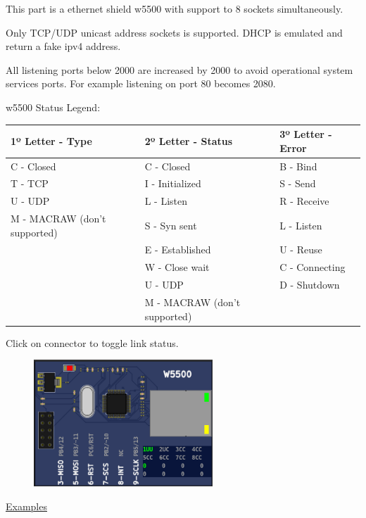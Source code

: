 This part is a ethernet shield w5500 with support to 8 sockets simultaneously.

Only TCP/UDP unicast address sockets is supported. 
DHCP is emulated and return a fake ipv4 address.

All listening ports below 2000 are increased by 2000 to avoid operational system services ports. 
For example listening on port 80 becomes 2080. 

w5500 Status Legend:
\begin{center}
\begin{tabular}{l|l|l}
\hline \textbf{1º Letter - Type} & \textbf{2º Letter - Status} & \textbf{3º Letter - Error}\\
\hline
\hline C - Closed & C - Closed & B - Bind\\
\hline T - TCP & I - Initialized & S - Send\\
\hline U - UDP & L - Listen & R - Receive\\
\hline M - MACRAW (don't supported) & S - Syn sent & L - Listen\\
\hline   & E - Established & U - Reuse\\
\hline   & W - Close wait & C - Connecting\\
\hline   & U - UDP & D - Shutdown\\
\hline   & M - MACRAW (don't supported) &   \\
\hline
\end{tabular}
\end{center}

Click on connector to toggle link status.

\begin{figure}[H]
\center
\includegraphics[width=0.6\textwidth]{img/part_w5500.png} 
\end{figure} 

\href{https://lcgamboa.github.io/picsimlab_examples/parts_ETH_w5500.html}{Examples}

\vspace{0.5cm}
 

